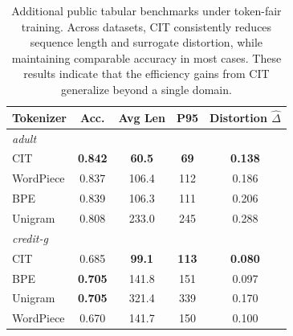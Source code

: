 \begin{table}[t]
\centering
\small
\setlength{\tabcolsep}{4pt}
\begin{tabular*}{\columnwidth}{@{\extracolsep{\fill}}lcccc@{}}
\toprule
Tokenizer & Acc. & Avg Len & P95 & Distortion $\hat{\Delta}$ \\
\midrule
\multicolumn{5}{l}{\textit{adult}}\\
CIT        & \textbf{0.842} & \textbf{60.5} & \textbf{69}  & \textbf{0.138} \\
WordPiece  & 0.837 & 106.4 & 112 & 0.186 \\
BPE        & 0.839 & 106.3 & 111 & 0.206 \\
Unigram    & 0.808 & 233.0 & 245 & 0.288 \\
\midrule
\multicolumn{5}{l}{\textit{credit-g}}\\
CIT        & 0.685 & \textbf{99.1} & \textbf{113} & \textbf{0.080} \\
BPE        & \textbf{0.705} & 141.8 & 151 & 0.097 \\
Unigram    & \textbf{0.705} & 321.4 & 339 & 0.170 \\
WordPiece  & 0.670 & 141.7 & 150 & 0.100 \\
\bottomrule
\end{tabular*}
\caption{Additional public tabular benchmarks under token-fair training. Across datasets, CIT consistently reduces sequence length and surrogate distortion, while maintaining comparable accuracy in most cases. These results indicate that the efficiency gains from CIT generalize beyond a single domain.}
\label{tab:e4_uci}
\end{table}
